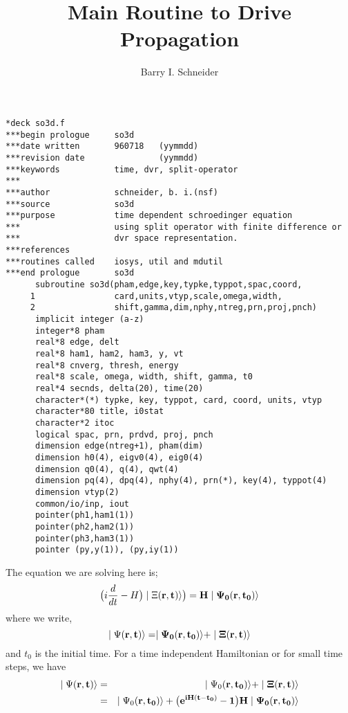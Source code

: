 \documentclass{article}
\title{Main Routine to Drive Propagation}
\author{Barry I. Schneider}
\date{}
\begin{document}
 \maketitle
\begin{verbatim}
*deck so3d.f 
***begin prologue     so3d
***date written       960718   (yymmdd)
***revision date               (yymmdd)
***keywords           time, dvr, split-operator
***                   
***author             schneider, b. i.(nsf)
***source             so3d
***purpose            time dependent schroedinger equation 
***                   using split operator with finite difference or 
***                   dvr space representation.
***references       
***routines called    iosys, util and mdutil
***end prologue       so3d
      subroutine so3d(pham,edge,key,typke,typpot,spac,coord,
     1                card,units,vtyp,scale,omega,width,
     2                shift,gamma,dim,nphy,ntreg,prn,proj,pnch)
      implicit integer (a-z)
      integer*8 pham
      real*8 edge, delt
      real*8 ham1, ham2, ham3, y, vt
      real*8 cnverg, thresh, energy
      real*8 scale, omega, width, shift, gamma, t0
      real*4 secnds, delta(20), time(20)
      character*(*) typke, key, typpot, card, coord, units, vtyp
      character*80 title, i0stat
      character*2 itoc
      logical spac, prn, prdvd, proj, pnch
      dimension edge(ntreg+1), pham(dim)
      dimension h0(4), eigv0(4), eig0(4)
      dimension q0(4), q(4), qwt(4)
      dimension pq(4), dpq(4), nphy(4), prn(*), key(4), typpot(4)
      dimension vtyp(2)
      common/io/inp, iout     
      pointer(ph1,ham1(1))
      pointer(ph2,ham2(1))
      pointer(ph3,ham3(1))
      pointer (py,y(1)), (py,iy(1))
\end{verbatim}
     The equation we are solving here is;
\begin{equation}
  \big ( i \frac{d}{dt} - H \big ) \mid \Xi (\bf{r},t) \rangle \big )
              = H \mid \Psi_{0} (\bf{r},t_{0} ) \rangle
\end{equation}
where we write,
\begin{equation}
   \mid \Psi( \bf{r},t ) \rangle = \mid \Psi_{0}( \bf{r},t_{0}) \rangle
                                   + \mid \Xi (\bf{r},t) \rangle
\end{equation}
 and $t_{0}$ is the initial time. For a time independent Hamiltonian or
 for small time steps, we have
\begin{eqnarray}
   \mid \Psi(\bf{r},t) \rangle &=& \mid \Psi_{0} (\bf{r},t_{0} ) \rangle
                               + \mid  \Xi(\bf{r},t) \rangle \\ \nonumber
                               &=& 
   \mid \Psi_{0} (\bf{r},t_{0} ) \rangle 
                       +  
   \big ( e^{iH(t-t_{0})} - 1 \big ) H \mid \Psi_{0} (\bf{r},t_{0} ) \rangle
\end{eqnarray}
\end{document}
